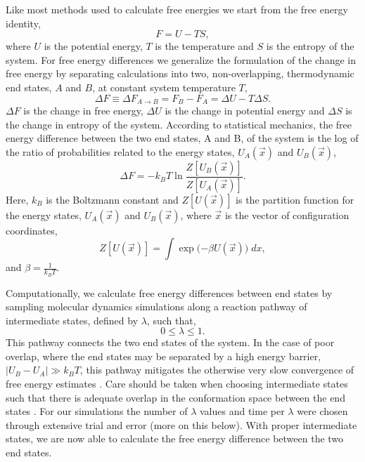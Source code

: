 \documentclass[fleqn,10pt,lineno]{wlpeerj} %
\begin{document}
Like most methods used to calculate free energies we start from the free energy identity,
\begin{equation}\label{eq:free_id}
    F = U - TS,
\end{equation}
where $U$ is the potential energy, $T$ is the temperature and $S$ is the entropy of the system.
For free energy differences we generalize the formulation of the change in free energy by separating calculations into two, non-overlapping, thermodynamic end states, $A$ and $B$, at constant system temperature $T$,
\begin{equation}
    \Delta F \equiv \Delta F_{A \rightarrow B} = F_{B} - F_{A}= \Delta U - T \Delta S.
\end{equation}
$\Delta F$ is the change in free energy, $\Delta U$ is the change in potential energy and $\Delta S$ is the change in entropy of the system.
According to statistical mechanics, the free energy difference between the two end states, A and B, of the system is the log of the ratio of probabilities related to the energy states, $U_{A}(\vec{x})$ and $U_{B}(\vec{x})$,
\begin{equation}\label{eq:free}
    \Delta F = -k_{B}T \ln{\frac{Z[U_{B}(\vec{x})]}{Z[U_{A}(\vec{x})]}}.
\end{equation}
Here, $k_{B}$ is the Boltzmann constant and $Z[U(\vec{x})]$ is the partition function for the energy states, $U_{A}(\vec{x})$ and $U_{B}(\vec{x})$, where $\vec{x}$ is the vector of configuration coordinates,
\begin{equation}\label{eq:part}
    Z[U(\vec{x})] = \int \exp{(-\beta U(\vec{x})}) \; dx,
\end{equation}
and $\beta = \frac{1}{k_{B}T}$.

Computationally, we calculate free energy differences between end states by sampling molecular dynamics simulations along a reaction pathway of intermediate states, defined by $\lambda$, such that,
\begin{equation}
    0 \leq \lambda \leq 1.
\end{equation}
This pathway connects the two end states of the system. In the case of poor overlap, where the end states may be separated by a high energy barrier, $|U_{B} - U_{A}| \gg k_{B}T$, this pathway mitigates the otherwise very slow convergence of free energy estimates \citep{Shirts2007}. Care should be taken when choosing intermediate states such that there is adequate overlap in the conformation space between the end states \citep{Shirts2007, Klimovich2015}. For our simulations the number of $\lambda$ values and time per $\lambda$ were chosen through extensive trial and error (more on this below). With proper intermediate states, we are now able to calculate the free energy difference between the two end states. 
\end{document}
